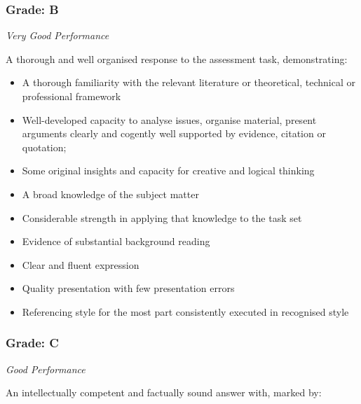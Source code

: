 \documentclass[12pt,a4paper]{article}
\begin{document}

\subsubsection*{Grade: B}

\textit{Very Good Performance}

A thorough and well organised response to the assessment task, demonstrating:

\begin{itemize}
	\item A thorough familiarity with the relevant literature or theoretical, technical or professional framework
	\item Well-developed capacity to analyse issues, organise material, present arguments clearly and cogently well supported by evidence, citation or quotation;
	\item Some original insights and capacity for creative and logical thinking
	\item A broad knowledge of the subject matter
	\item Considerable strength in applying that knowledge to the task set
	\item Evidence of substantial background reading
	\item Clear and fluent expression
	\item Quality presentation with few presentation errors
	\item Referencing style for the most part consistently executed in recognised style
\end{itemize}

\subsubsection*{Grade: C}

\textit{Good Performance}

An intellectually competent and factually sound answer with, marked by:
\end{document}
